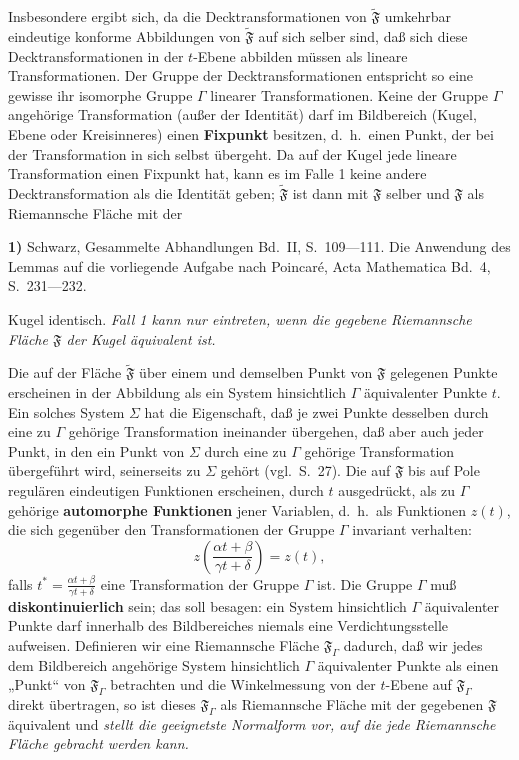 \documentclass{article}
\begin{document}
Insbesondere ergibt sich, da die Decktransformationen von $\widetilde{\mathfrak{F}}$ umkehrbar eindeutige konforme Abbildungen von $\widetilde{\mathfrak{F}}$ auf sich selber sind, daß sich diese Decktransformationen in der $t$-Ebene abbilden müssen als lineare Transformationen. Der Gruppe der Decktransformationen entspricht so eine gewisse ihr isomorphe Gruppe $\varGamma$ linearer Transformationen. Keine der Gruppe $\varGamma$ angehörige Transformation (außer der Identität) darf im Bildbereich (Kugel, Ebene oder Kreisinneres) einen \textbf{Fixpunkt} besitzen, d.~h.\ einen Punkt, der bei der Transformation in sich selbst übergeht. Da auf der Kugel jede lineare Transformation einen Fixpunkt hat, kann es im Falle 1 keine andere Decktransformation als die Identität geben; $\widetilde{\mathfrak{F}}$ ist dann mit $\mathfrak{F}$ selber und $\mathfrak{F}$ als Riemannsche Fläche mit der

\textbf{1)} Schwarz, Gesammelte Abhandlungen Bd.~II, S.~109---111. Die Anwendung des Lemmas auf die vorliegende Aufgabe nach Poincaré, Acta Mathematica Bd.~4, S.~231---232.

Kugel identisch. \emph{Fall 1 kann nur eintreten, wenn die gegebene Riemannsche Fläche $\mathfrak{F}$ der Kugel äquivalent ist.}

Die auf der Fläche $\widetilde{\mathfrak{F}}$ über einem und demselben Punkt von $\mathfrak{F}$ gelegenen Punkte erscheinen in der Abbildung als ein System hinsichtlich $\varGamma$ äquivalenter Punkte $t$. Ein solches System $\Sigma$ hat die Eigenschaft, daß je zwei Punkte desselben durch eine zu $\varGamma$ gehörige Transformation ineinander übergehen, daß aber auch jeder Punkt, in den ein Punkt von $\Sigma$ durch eine zu $\varGamma$ gehörige Transformation übergeführt wird, seinerseits zu $\Sigma$ gehört (vgl.\ S.~27). Die auf $\mathfrak{F}$ bis auf Pole regulären eindeutigen Funktionen erscheinen, durch $t$ ausgedrückt, als zu $\varGamma$ gehörige \textbf{automorphe Funktionen} jener Variablen, d.~h.\ als Funktionen $z(t)$, die sich gegenüber den Transformationen der Gruppe $\varGamma$ invariant verhalten:
\[ z \left( \frac{\alpha t + \beta}{\gamma t + \delta} \right) = z(t), \]
falls $t^* = \frac{\alpha t + \beta}{\gamma t + \delta}$ eine Transformation der Gruppe $\varGamma$ ist. Die Gruppe $\varGamma$ muß \textbf{diskontinuierlich} sein; das soll besagen: ein System hinsichtlich $\varGamma$ äquivalenter Punkte darf innerhalb des Bildbereiches niemals eine Verdichtungsstelle aufweisen. Definieren wir eine Riemannsche Fläche $\mathfrak{F}_\varGamma$ dadurch, daß wir jedes dem Bildbereich angehörige System hinsichtlich $\varGamma$ äquivalenter Punkte als einen „Punkt“ von $\mathfrak{F}_\varGamma$ betrachten und die Winkelmessung von der $t$-Ebene auf $\mathfrak{F}_\varGamma$ direkt übertragen, so ist dieses $\mathfrak{F}_\varGamma$ als Riemannsche Fläche mit der gegebenen $\mathfrak{F}$ äquivalent und \emph{stellt die geeignetste Normalform vor, auf die jede Riemannsche Fläche gebracht werden kann.}
\end{document}
